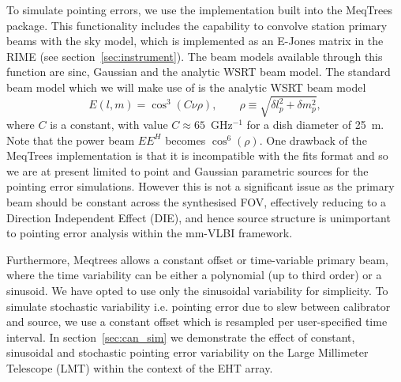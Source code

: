 To simulate pointing errors, we use the implementation built into the {\sc MeqTrees} package. This functionality includes the capability to convolve station primary beams with the sky model, which is implemented as an E-Jones matrix in the RIME (see section~\ref{sec:instrument}). The beam models available through this function are sinc, Gaussian and the analytic WSRT beam model. The standard beam model which we will make use of is the analytic WSRT beam model \citep{Popping_2008} 
\begin{equation}\label{eq:wsrt_beam}
E(l, m) = \cos^3(C\nu \rho),\qquad   \rho \equiv \sqrt{\delta l_p^2 + \delta m_p^2},
\end{equation}
where $C$ is a constant, with value $C \approx 65$~GHz$^{-1}$ for a dish diameter of 25~m. Note that the power beam $EE^H$ becomes $\cos^6(\rho)$.  One drawback of the {\sc MeqTrees} implementation is that it is incompatible with the {\sc fits} format and so we are at present limited to point and Gaussian parametric sources for the pointing error simulations. However this is not a significant issue as the primary beam should be constant across the synthesised FOV, effectively reducing to a Direction Independent Effect (DIE), and hence source structure is unimportant to pointing error analysis within the mm-VLBI framework.


Furthermore, {\sc Meqtrees} allows a constant offset or time-variable primary beam, where the time variability can be either a polynomial (up to third order) or a sinusoid. We have opted to use only the sinusoidal variability for simplicity. To simulate stochastic variability i.e. pointing error due to slew between calibrator and source, we use a constant offset which is resampled per user-specified time interval. In section~\ref{sec:can_sim} we demonstrate the effect of constant, sinusoidal and stochastic pointing error variability on the Large Millimeter Telescope (LMT) within the context of the EHT array.

